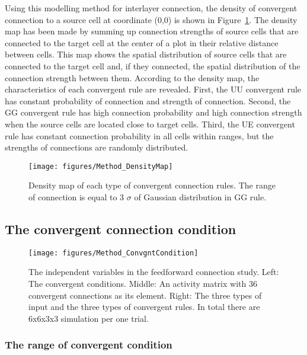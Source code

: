 \begin{enumerate}
\begin{enumerate}
   \end{enumerate}
  \end{enumerate}

Using this modelling method for interlayer connection, the density of convergent connection to a source cell at coordinate (0,0) is shown in Figure~\ref{fig:DenseMap}. The density map has been made by summing up connection strengths of source cells that are connected to the target cell at the center of a plot in their relative distance between cells. This map shows the spatial distribution of source cells that are connected to the target cell and, if they connected, the spatial distribution of the connection strength between them. According to the density map, the characteristics of each convergent rule are revealed. First, the UU convergent rule has constant probability of connection and strength of connection. Second, the GG convergent rule has high connection probability and high connection strength when the source cells are located close to target cells. Third, the UE convergent rule has constant connection probability in all cells within ranges, but the strengths of connections are randomly distributed.



\begin{figure}[!t]
	\centering
	\texttt{[image: figures/Method\_DensityMap]}
	\caption{Density map of each type of convergent connection rules. The range of connection is equal to 3 $\sigma$ of Gaussian distribution in GG rule.}
	\label{fig:DenseMap}
\end{figure} 

\subsection{The convergent connection condition}

\begin{figure}[!ht]
	\centering
	\texttt{[image: figures/Method\_ConvgntCondition]}
	\caption{The independent variables in the feedforward connection study. Left: The convergent conditions. Middle: An activity matrix with 36 convergent connections as its element. Right: The three types of input and the three types of convergent rules. In total there are 6x6x3x3 simulation per one trial.}
	\label{fig:ConvergentConn}
\end{figure} 

\subsubsection{The range of convergent condition}

